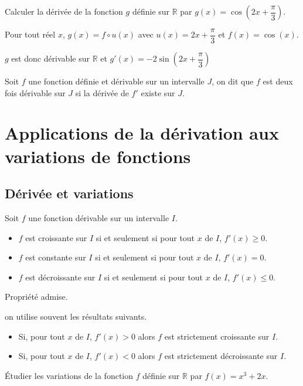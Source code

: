 \documentclass[french]{book}
\newcommand{\R}{\mathbb {R}}
\newcommand{\se}{\geq}
\newcommand{\ie}{\leq}
\begin{document}
\begin{exemple}
Calculer la dérivée de la fonction $g$ définie sur $\R$ par $g(x)=\cos\left(2x+\dfrac{\pi}{3}\right)$.
\end{exemple}


Pour tout réel $x$, $g(x)=f\circ u (x)$ avec $u(x)=2x+\dfrac{\pi}{3}$ et $f(x)=\cos(x)$.

$g$ est donc dérivable sur $\R$ et $g'(x)=-2\sin\left(2x+\dfrac{\pi}{3}\right)$


\begin{defn}
Soit $f$ une fonction définie et dérivable sur un intervalle $J$, on dit que $f$ est deux fois dérivable sur $J$ si la dérivée de $f'$ existe sur $J$. 
\end{defn}


\section{Applications de la dérivation aux variations de fonctions}
\subsection{Dérivée et variations}
\begin{prop}
Soit $f$ une fonction dérivable sur un intervalle $I$.
\begin{itemize}
\item $f$ est croissante sur $I$ si et seulement si pour tout $x$ de $I$, $f'(x)\se 0$.
\item $f$ est constante sur $I$ si et seulement si pour tout $x$ de $I$, $f'(x)=0$.
\item $f$ est décroissante sur $I$ si et seulement si pour tout $x$ de $I$, $f'(x)\ie 0$.
\end{itemize}
\end{prop}

Propriété admise.

\begin{rem}
on utilise souvent les résultats suivants.
\begin{itemize}
\item Si, pour tout $x$ de $I$, $f'(x)>0$ alors $f$ est strictement croissante sur $I$.
\item Si, pour tout $x$ de $I$, $f'(x)<0$ alors $f$ est strictement décroissante sur $I$.
\end{itemize}
\end{rem}

\begin{exemple}
Étudier les variations de la fonction $f$ définie sur $\R$ par $f(x)=x^{3}+2x$.
\end{exemple}
\end{document}
